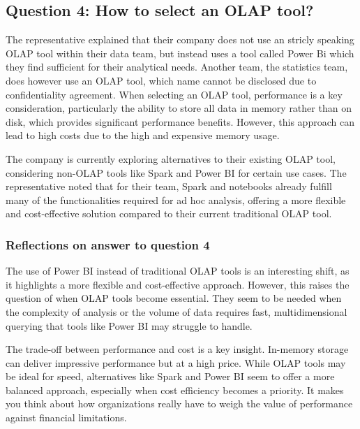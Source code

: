 \subsection{Question 4: How to select an OLAP tool?}

The representative explained that their company does not use an stricly speaking OLAP tool within their data team, but instead uses a tool called Power Bi which they find sufficient for their analytical needs. 
Another team, the statistics team, does however use an OLAP tool, which name cannot be disclosed due to confidentiality agreement. 
When selecting an OLAP tool, performance is a key consideration, particularly the ability to store all data in memory rather than on disk, which 
provides significant performance benefits. However, this approach can lead to high costs due to the high and expensive memory usage.

The company is currently exploring alternatives to their existing OLAP tool, considering non-OLAP tools like Spark and Power BI for certain use cases. 
The representative noted that for their team, Spark and notebooks already fulfill many of the functionalities required for ad hoc analysis, 
offering a more flexible and cost-effective solution compared to their current traditional OLAP tool.

\subsubsection{Reflections on answer to question 4}

The use of Power BI instead of traditional OLAP tools is an interesting shift, as it highlights a more flexible and cost-effective approach. 
However, this raises the question of when OLAP tools become essential. They seem to be needed when the complexity of analysis or the volume 
of data requires fast, multidimensional querying that tools like Power BI may struggle to handle.

The trade-off between performance and cost is a key insight. In-memory storage can deliver impressive performance but at a high price. 
While OLAP tools may be ideal for speed, alternatives like Spark and Power BI seem to offer a more balanced approach, 
especially when cost efficiency becomes a priority. 
It makes you think about how organizations really have to weigh the value of performance against financial limitations.





